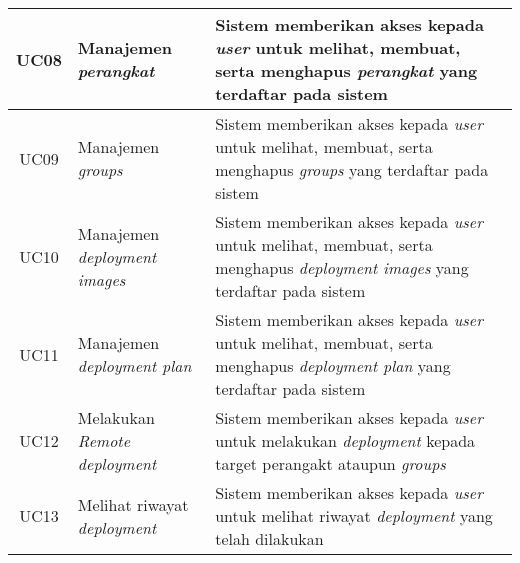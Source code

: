 \begin{table}[ht]
\begin{tabular}{|c|p{4cm}|p{8cm}|}
    \hline
    UC08 & Manajemen \textit{perangkat}               & Sistem memberikan akses kepada \textit{user} untuk melihat, membuat, serta menghapus \textit{perangkat} yang terdaftar pada sistem         \\
    \hline
    UC09 & Manajemen \textit{groups}                  & Sistem memberikan akses kepada \textit{user} untuk melihat, membuat, serta menghapus \textit{groups} yang terdaftar pada sistem            \\
    \hline
    UC10 & Manajemen \textit{deployment images}       & Sistem memberikan akses kepada \textit{user} untuk melihat, membuat, serta menghapus \textit{deployment images} yang terdaftar pada sistem \\
    \hline
    UC11 & Manajemen \textit{deployment plan}         & Sistem memberikan akses kepada \textit{user} untuk melihat, membuat, serta menghapus \textit{deployment plan} yang terdaftar pada sistem   \\
    \hline
    UC12 & Melakukan \textit{Remote deployment}       & Sistem memberikan akses kepada \textit{user} untuk melakukan \textit{deployment} kepada target perangakt ataupun \textit{groups}           \\
    \hline
    UC13 & Melihat riwayat \textit{deployment}        & Sistem memberikan akses kepada \textit{user} untuk melihat riwayat \textit{deployment} yang telah dilakukan                                \\
    \hline
  \end{tabular}
\end{table}
\egroup